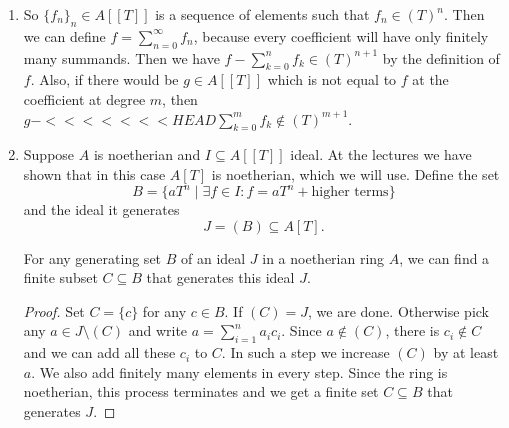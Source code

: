 \newcommand{\sheet}{3}




\maketitle

\begin{exercise}{1}
    \begin{enumerate}
        \item So ${\{f_n\}}_n \in A[[T]]$ is a sequence of elements such that $f_n
            \in {(T)}^n$. Then we can define $f = \sum^{\infty}_{n = 0} f_n$,
            because every coefficient will have only finitely many summands.
            Then we have $f - \sum^{n}_{k = 0} f_k \in {(T)}^{n+1}$ by
            the definition of $f$. Also, if there would be $g \in A[[T]]$ which
            is not equal to $f$ at the coefficient at degree $m$, then $g -
<<<<<<< HEAD
            \sum^{m}_{k = 0} f_k \notin {(T)}^{m+1}$.
        \item Suppose $A$ is noetherian and $I \subseteq A[[T]]$ ideal. At the
            lectures we have shown that in this case $A[T]$ is noetherian, which
            we will use.
            Define the set
            \begin{equation*}
                B = \{ a T^n \mid \exists f \in I \colon f = a T^n +
                \text{higher terms} \}
            \end{equation*}
            and the ideal it generates
            \begin{equation*}
                J = (B) \subseteq A[T].
            \end{equation*}

            \begin{claim}
                For any generating set $B$ of an ideal $J$ in a noetherian ring
                $A$, we can find a finite subset $C \subseteq B$ that generates
                this ideal $J$.
            \end{claim}

            \begin{proof}
                Set $C = \{c\}$ for any $c \in B$. If $(C) = J$, we are done.
                Otherwise pick any $a \in J \setminus (C)$ and write $a =
                \sum^{n}_{i=1} a_i c_i$. Since $a \notin (C)$, there is $c_i
                \notin C$ and we can add all these $c_i$ to $C$. In such a step
                we increase $(C)$ by at least $a$. We also add finitely many
                elements in every step. Since the ring is noetherian, this
                process terminates and we get a finite set $C \subseteq B$ that
                generates $J$.
            \end{proof}


\end{enumerate}
\end{exercise}
